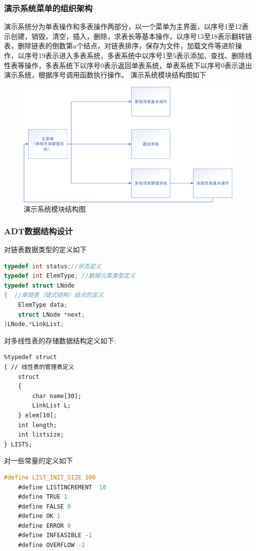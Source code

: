 \documentclass[supercite]{Experimental_Report}
\theoremstyle{definition}
\begin{document}
\subsubsection{演示系统菜单的组织架构}
\quad 演示系统分为单表操作和多表操作两部分，以一个菜单为主界面，以序号1至12表示创建，销毁，清空，插入，删除，求表长等基本操作，以序号13至18表示翻转链表，删除链表的倒数第n个结点，对链表排序，保存为文件，加载文件等进阶操作，以序号19表示进入多表系统，多表系统中以序号1至5表示添加、查找、删除线性表等操作，多表系统下以序号0表示返回单表系统，单表系统下以序号0表示退出演示系统，根据序号调用函数执行操作。
演示系统模块结构图如下
\begin{figure}[H] %
	\begin{center}
		\includegraphics[width=1\linewidth]{images/2.1.png}
		\caption{演示系统模块结构图}
	\end{center}
\end{figure}
\subsubsection{ADT数据结构设计}
\noindent 对链表数据类型的定义如下\par
\begin{lstlisting}[language=C] 
typedef int status;//状态定义 
typedef int ElemType; //数据元素类型定义
typedef struct LNode
{  //单链表（链式结构）结点的定义
	ElemType data;
	struct LNode *next;
}LNode,*LinkList;
\end{lstlisting}
对多线性表的存储数据结构定义如下:
\begin{lstlisting}
%typedef struct
{ // 线性表的管理表定义
	struct
	{
		char name[30];
		LinkList L;
	} elem[10];
	int length;
	int listsize;
} LISTS;
\end{lstlisting}
对一些常量的定义如下
\begin{lstlisting}[language=C] 
	#define LIST_INIT_SIZE 100
	#define LISTINCREMENT  10
	#define TRUE 1
	#define FALSE 0
	#define OK 1
	#define ERROR 0
	#define INFEASIBLE -1
	#define OVERFLOW -2
\end{lstlisting}
\end{document}
